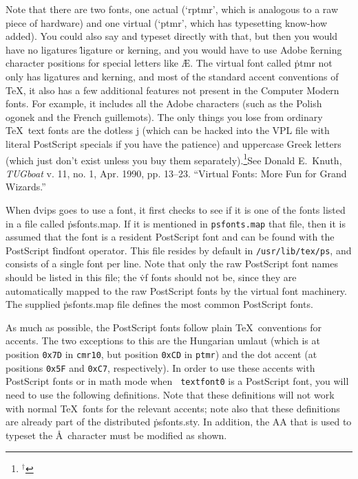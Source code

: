 Note that there are two fonts, one actual (`rptmr',
which is analogous to a raw piece of hardware) and one virtual
(`ptmr', which has typesetting know-how added). You could also say
\noindent
and typeset directly with that, but then you would have no ligatures
\^{ligature}
or kerning, and you would have to use Adobe
\^{kerning}
character positions for special letters like \AE. The virtual font
called \.{ptmr}
not only has ligatures and kerning, and most of the standard
accent conventions of \TeX, it also has a few additional features
not present in the Computer Modern fonts. For example, it includes all
the Adobe characters (such as the Polish ogonek and the French
guillemots).  The only things you lose from ordinary \TeX\ text fonts are
the dotless j (which can be hacked into the VPL file with
literal PostScript specials if you have the patience) and
uppercase Greek letters (which just don't exist unless you buy
them separately).\footnote{${}^\dagger$}{See Donald E.~Knuth, {\it TUGboat}
v. 11, no. 1, Apr. 1990, pp. 13--23.  ``Virtual Fonts:  More Fun
for Grand Wizards.''}

When \.{dvips} goes to use a font, it first checks to see if it is one of
the fonts listed in a file called \.{psfonts.map}.  If it is mentioned in
\^{{\tt psfonts.map}}
that file, then it is assumed that the font is a resident PostScript font
and can be found with the PostScript \.{findfont} operator.  This file
resides by default in {\tt /usr/lib/tex/ps}, and consists of a single font
per line.  Note that only the raw PostScript font names should be listed
in this file; the \.{vf} fonts should not be, since they are automatically
mapped to the raw PostScript fonts by the virtual font machinery.
The supplied \.{psfonts.map} file defines the most common PostScript fonts.

As much as possible, the PostScript fonts follow plain \TeX\ conventions
for accents.  The two exceptions to this are the Hungarian umlaut (which
is at position {\tt 0x7D} in {\tt cmr10}, but position {\tt 0xCD} in
{\tt ptmr}) and the dot accent (at positions {\tt 0x5F} and {\tt 0xC7},
respectively).  In order to use these accents with PostScript fonts or in
math mode when {\tt {} textfont0} is a PostScript font, you will need
to use the following definitions.  Note that these definitions will not work
with normal \TeX\ fonts for the relevant accents; note also that these
definitions are already part of the distributed \.{psfonts.sty}.
In addition, the \.{ AA} that is used to typeset the \AA\ character
must be modified as shown.

